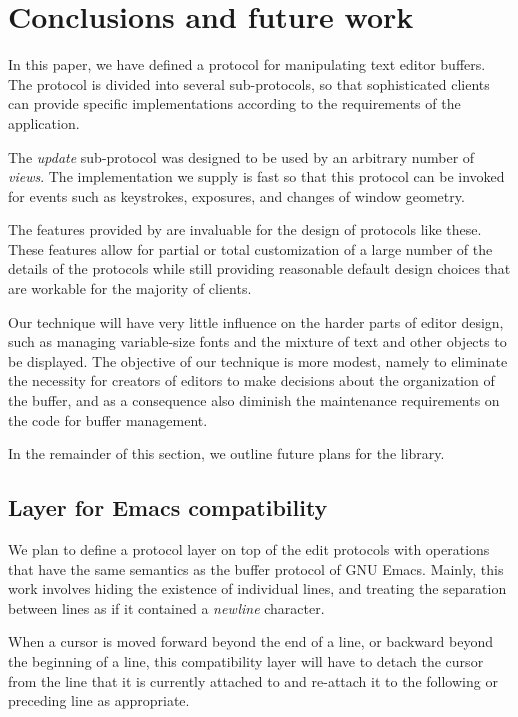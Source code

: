 \section{Conclusions and future work}

In this paper, we have defined a \clos{} protocol for manipulating
text editor buffers.  The protocol is divided into several
sub-protocols, so that sophisticated clients can provide specific
implementations according to the requirements of the application.

The \emph{update} sub-protocol was designed to be used by an arbitrary
number of \emph{views}.  The implementation we supply is fast so that
this protocol can be invoked for events such as keystrokes, exposures,
and changes of window geometry.

The features provided by \clos{} are invaluable for the design of
protocols like these.  These features allow for partial or total
customization of a large number of the details of the protocols while
still providing reasonable default design choices that are workable
for the majority of clients.

Our technique will have very little influence on the harder parts of
editor design, such as managing variable-size fonts and the mixture of
text and other objects to be displayed.  The objective of our
technique is more modest, namely to eliminate the necessity for
creators of editors to make decisions about the organization of the
buffer, and as a consequence also diminish the maintenance
requirements on the code for buffer management.

In the remainder of this section, we outline future plans for the
library.

\subsection{Layer for Emacs compatibility}

We plan to define a protocol layer on top of the edit protocols with
operations that have the same semantics as the buffer protocol of GNU
Emacs.  Mainly, this work involves hiding the existence of individual
lines, and treating the separation between lines as if it contained a
\emph{newline} character.

When a cursor is moved forward beyond the end of a line, or backward
beyond the beginning of a line, this compatibility layer will have to
detach the cursor from the line that it is currently attached to and
re-attach it to the following or preceding line as appropriate.

